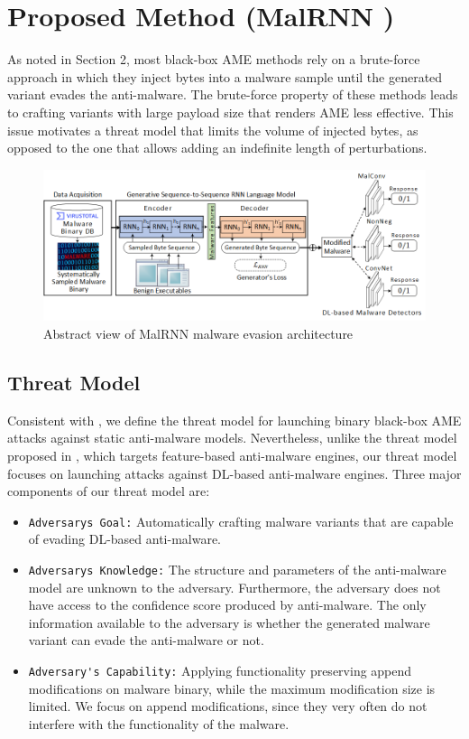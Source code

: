 \documentclass[letterpaper]{article}
\newcommand{\malrnn}{M\lowercase{a}lRNN }
\begin{document}
\section{Proposed Method (\malrnn)}
\label{method}

As noted in Section 2, most black-box AME methods rely on a brute-force approach in which they inject bytes into a malware sample until the generated variant evades the anti-malware. The brute-force property of these methods leads to crafting variants with large payload size that renders AME less effective. This issue motivates a threat model that limits the volume of injected bytes, as opposed to the one that allows adding an indefinite length of perturbations.

\begin{figure}[t]
    \centering
    \includegraphics[width=1\textwidth]{Model_Illustration.png}
    \caption{Abstract view of \malrnn malware evasion architecture}
    \label{architecture}
\end{figure}

\subsection{Threat Model}
Consistent with \cite{anderson2018learning}, we define the threat model for launching binary black-box AME attacks against static anti-malware models. Nevertheless, unlike the threat model proposed in \cite{anderson2018learning}, which targets feature-based anti-malware engines, our threat model focuses on launching attacks against DL-based anti-malware engines. Three major components of our threat model are:

    \begin{itemize}
        \item{\verb|Adversarys Goal:|} Automatically crafting malware variants that are capable of evading DL-based anti-malware.
        \item{\verb|Adversarys Knowledge:|} The structure and parameters of the anti-malware model are unknown to the adversary. Furthermore, the adversary does not have access to the confidence score produced by anti-malware. The only information available to the adversary is whether the generated malware variant can evade the anti-malware or not.
        \item{\verb|Adversary's Capability:|} Applying functionality preserving append modifications on malware binary, while the maximum modification size is limited. We focus on append modifications, since they very often do not interfere with the functionality of the malware.
    \end{itemize}
\end{document}
